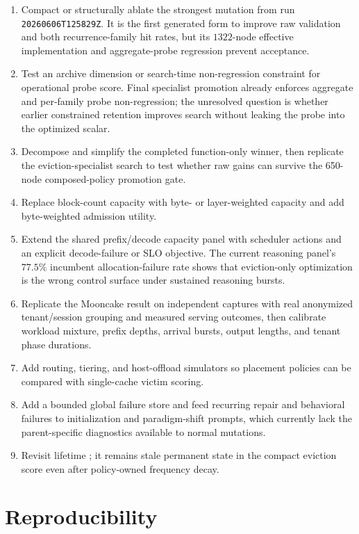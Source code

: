 \documentclass[11pt]{article}
\newcommand{\code}[1]{\texttt{\detokenize{#1}}}
\newcommand{\identifier}[1]{\nolinkurl{#1}}
\begin{document}
\begin{enumerate}
  \item Compact or structurally ablate the strongest mutation from run
  \identifier{20260606T125829Z}.  It is the first generated form to improve raw
  validation and both recurrence-family hit rates, but its \(1322\)-node effective
  implementation and aggregate-probe regression prevent acceptance.
  \item Test an archive dimension or search-time non-regression constraint for
  operational probe score.  Final specialist promotion already enforces aggregate and
  per-family probe non-regression; the unresolved question is whether earlier
  constrained retention improves search without leaking the probe into the optimized
  scalar.
  \item Decompose and simplify the completed function-only winner, then replicate the
  eviction-specialist search to test whether raw gains can survive the 650-node
  composed-policy promotion gate.
  \item Replace block-count capacity with byte- or layer-weighted capacity and add
  byte-weighted admission utility.
  \item Extend the shared prefix/decode capacity panel with scheduler actions and an
  explicit decode-failure or SLO objective.  The current reasoning panel's \(77.5\%\)
  incumbent allocation-failure rate shows that eviction-only optimization is the wrong
  control surface under sustained reasoning bursts.
  \item Replicate the Mooncake result on independent captures with real anonymized
  tenant/session grouping and measured serving outcomes, then calibrate workload
  mixture, prefix depths, arrival bursts, output lengths, and tenant phase durations.
  \item Add routing, tiering, and host-offload simulators so placement policies can be
  compared with single-cache victim scoring.
  \item Add a bounded global failure store and feed recurring repair and behavioral
  failures to initialization and paradigm-shift prompts, which currently lack the
  parent-specific diagnostics available to normal mutations.
  \item Revisit lifetime \code{block.hit_count}; it remains stale permanent state in the
  compact eviction score even after policy-owned frequency decay.
\end{enumerate}

\section{Reproducibility}
\end{document}
